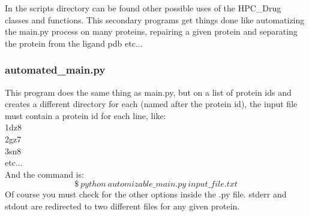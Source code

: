 		In the scripts directory can be found other possible uses of the HPC\_Drug classes and functions. This secondary programs get things done like automatizing the main.py process on many proteins, repairing a given protein and separating the protein from the ligand pdb etc...
		
		\subsubsection{automated\_main.py}
		
			This program does the same thing as main.py, but on a list of protein ids and creates a different directory for each (named after the protein id), the input file must contain a protein id for each line, like:\\
			1dz8\\
			2gz7\\
			3sn8\\
			etc...\\
			$ $\\
			And the command is:
			\[
			\$\ python\ automizable\_main.py\ input\_file.txt
			\]
			Of course you must check for the other options inside the .py file. stderr and stdout are redirected to two different files for any given protein.
				
